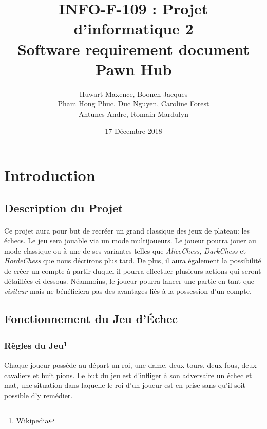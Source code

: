 \documentclass[10pt, a4paper]{article}
\title{\LARGE{INFO-F-109 : Projet d'informatique 2 }\\
       \textbf{Software requirement document\\
	   Pawn Hub}}
\author{Huwart Maxence, Boonen Jacques\\
		Pham Hong Phuc, Duc Nguyen, Caroline Forest\\
		Antunes Andre, Romain Mardulyn}
\date{17 Décembre 2018}
\begin{document}
	\maketitle
	\newpage
	\renewcommand{\contentsname}{Table des Matières}
	\tableofcontents %
	\newpage
	\section{Introduction}
		\subsection{Description du Projet}
			\paragraph{}Ce projet aura pour but de recréer un grand classique des jeux de plateau: les échecs. Le jeu sera jouable via un mode multijoueurs. Le joueur pourra jouer au mode classique ou à une de ses variantes telles que  {\itshape AliceChess, DarkChess} et {\itshape HordeChess} que nous décrirons plus tard. De plus, il aura également la possibilité de créer un compte à partir duquel il pourra effectuer plusieurs actions qui seront détaillées ci-dessous. Néanmoins, le joueur pourra lancer une partie en tant que {\itshape visiteur} mais ne bénéficiera pas des avantages liés à la possession d'un compte.
			\subsection{Fonctionnement du Jeu d'Échec}
			\subsubsection{Règles du Jeu\footnote{Wikipedia}} Chaque joueur possède au départ un roi, une dame, deux tours, deux fous, deux cavaliers et huit pions. Le but du jeu est d'infliger à son adversaire un échec et mat, une situation dans laquelle le roi d'un joueur est en prise sans qu'il soit possible d'y remédier.
\end{document}
